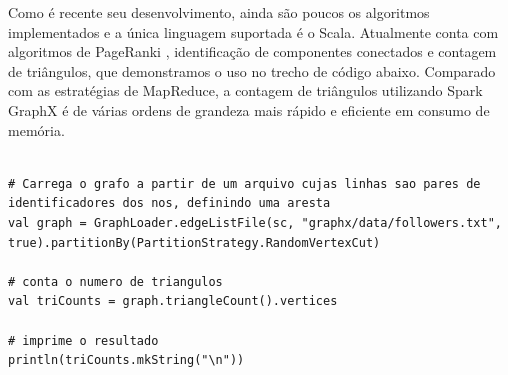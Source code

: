 Como é recente seu desenvolvimento, ainda são poucos os algoritmos implementados e a única linguagem 
suportada é o Scala. Atualmente conta com algoritmos de PageRanki \citep{brin2012reprint}, identificação 
de componentes conectados e contagem de triângulos, que demonstramos o uso no trecho de código abaixo. 
Comparado com as estratégias de MapReduce, a contagem de triângulos utilizando Spark GraphX é de 
várias ordens de grandeza mais rápido e eficiente em consumo de memória. 


\begin{lstlisting}[style=MyPythonStyle]

# Carrega o grafo a partir de um arquivo cujas linhas sao pares de identificadores dos nos, definindo uma aresta
val graph = GraphLoader.edgeListFile(sc, "graphx/data/followers.txt", true).partitionBy(PartitionStrategy.RandomVertexCut)

# conta o numero de triangulos
val triCounts = graph.triangleCount().vertices

# imprime o resultado
println(triCounts.mkString("\n"))

\end{lstlisting}
